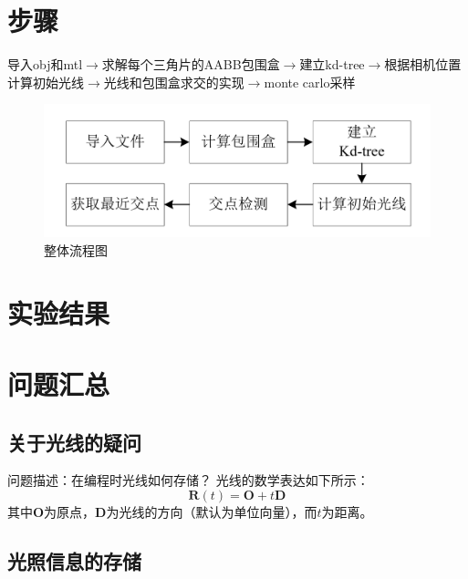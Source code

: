 \documentclass[10pt]{article}
\begin{document}
\section{步骤}
导入obj和mtl$\to$求解每个三角片的AABB包围盒$\to$建立kd-tree$\to$根据相机位置计算初始光线$\to$光线和包围盒求交的实现$\to$monte carlo采样
\begin{figure}[H]
\begin{center}
\includegraphics[scale=0.3]{chart_flow.png}
\caption{整体流程图}
\end{center}
\end{figure}

\section{实验结果}



\section{问题汇总}
\subsection{关于光线的疑问}
问题描述：在编程时光线如何存储？
光线的数学表达如下所示：
$$\bm{R}(t)=\bm{O}+t\bm{D}$$
其中$\bm{O}$为原点，$\bm{D}$为光线的方向（默认为单位向量），而$t$为距离。
\subsection{光照信息的存储}
\end{document}
